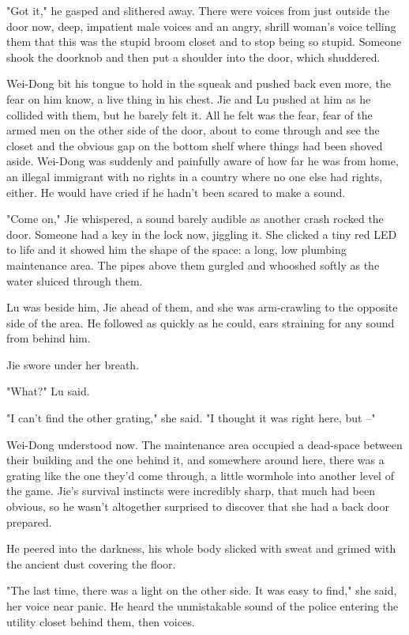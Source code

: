 "Got it," he gasped and slithered away. There were voices from just
outside the door now, deep, impatient male voices and an angry,
shrill woman's voice telling them that this was the stupid broom
closet and to stop being so stupid. Someone shook the doorknob and
then put a shoulder into the door, which shuddered.

Wei-Dong bit his tongue to hold in the squeak and pushed back even
more, the fear on him know, a live thing in his chest. Jie and Lu
pushed at him as he collided with them, but he barely felt it. All
he felt was the fear, fear of the armed men on the other side of
the door, about to come through and see the closet and the obvious
gap on the bottom shelf where things had been shoved aside.
Wei-Dong was suddenly and painfully aware of how far he was from
home, an illegal immigrant with no rights in a country where no one
else had rights, either. He would have cried if he hadn't been
scared to make a sound.

"Come on," Jie whispered, a sound barely audible as another crash
rocked the door. Someone had a key in the lock now, jiggling it.
She clicked a tiny red LED to life and it showed him the shape of
the space: a long, low plumbing maintenance area. The pipes above
them gurgled and whooshed softly as the water sluiced through
them.

Lu was beside him, Jie ahead of them, and she was arm-crawling to
the opposite side of the area. He followed as quickly as he could,
ears straining for any sound from behind him.

Jie swore under her breath.

"What?" Lu said.

"I can't find the other grating," she said. "I thought it was right
here, but --"

Wei-Dong understood now. The maintenance area occupied a dead-space
between their building and the one behind it, and somewhere around
here, there was a grating like the one they'd come through, a
little wormhole into another level of the game. Jie's survival
instincts were incredibly sharp, that much had been obvious, so he
wasn't altogether surprised to discover that she had a back door
prepared.

He peered into the darkness, his whole body slicked with sweat and
grimed with the ancient dust covering the floor.

"The last time, there was a light on the other side. It was easy to
find," she said, her voice near panic. He heard the unmistakable
sound of the police entering the utility closet behind them, then
voices.

